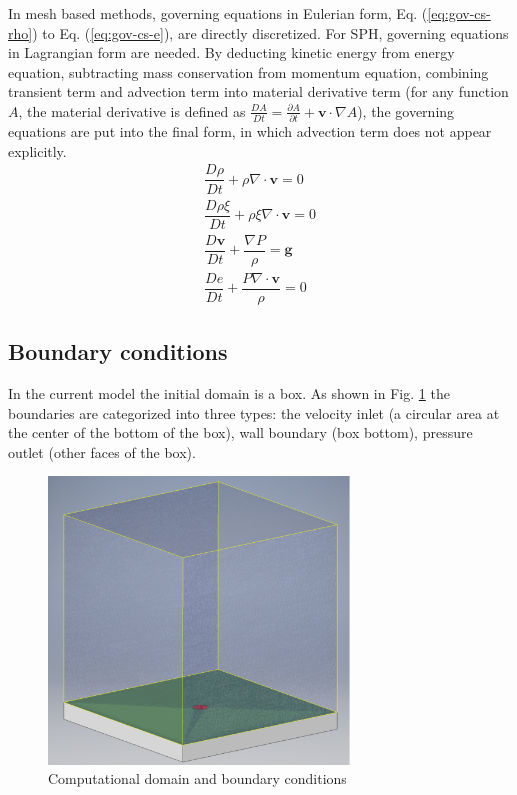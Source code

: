In mesh based methods, governing equations in Eulerian form, Eq. (\ref{eq:gov-cs-rho}) to Eq. (\ref{eq:gov-cs-e}), are directly discretized. For SPH, governing equations in Lagrangian form are needed. By deducting kinetic energy from energy equation, subtracting mass conservation from momentum equation, combining transient term and advection term into material derivative term (for any function $A$, the material derivative is defined as $\frac{D A}{Dt} = \frac{\partial A}{\partial t} + \textbf{v} \cdot \nabla A$), the governing equations are put into the final form, in which advection term does not appear explicitly.
\begin{align}
\dfrac{D \rho}{D t} + \rho \nabla \cdot \textbf{v} = 0 \label{eq:gov-nc-rho}\\
\dfrac{D \rho \xi}{D t} + \rho \xi \nabla \cdot \textbf{v} = 0 \label{eq:gov-nc-ks}\\
\dfrac{D \textbf{v}}{D t} + \dfrac{\nabla P}{\rho} =\textbf{g} \label{eq:gov-nc-v}\\
\dfrac{D e}{D t} + \dfrac{P \nabla \cdot \textbf{v}}{\rho} = 0 \label{eq:gov-nc-e}
\end{align}

\subsection{Boundary conditions}
In the current model the initial domain is a box. As shown in Fig. \ref{fig:domain-BCs} the boundaries are categorized into three types: the velocity inlet (a circular area at the center of the bottom of the box), wall boundary (box bottom), pressure outlet (other faces of the box).
\begin{figure}
\center
\includegraphics[width=8cm]{Chapter-2/Figures/Domain_good}
\caption{Computational domain and boundary conditions}
\label{fig:domain-BCs}
\end{figure}

